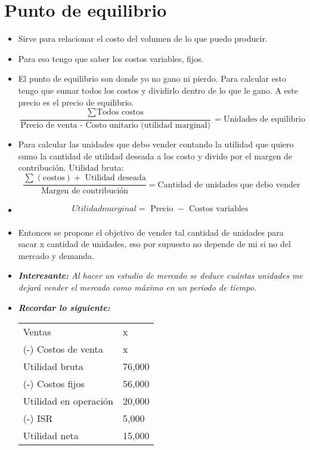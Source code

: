 \section{Punto de equilibrio}
\begin{itemize}
    \item Sirve para relacionar el costo del volumen de lo que puedo producir.
    \item Para eso tengo que saber los costos variables, fijos.
    \item El punto de equilibrio son donde yo no gano ni pierdo. Para calcular esto tengo que sumar todos los costos y dividirlo dentro de lo que le gano. A este precio es el precio de equilibrio.
        \[
          \frac{\sum_{}^{}\text{Todos costos}}{\text{Precio de venta - Costo unitario (utilidad marginal)}} = \text{Unidades de equilibrio }
        \]
        
    \item Para calcular las unidades que debo vender contando la utilidad que quiero sumo la cantidad de utilidad deseada a los costo y divido por el margen de contribución. Utilidad bruta: 
        \[
        \frac{\sum_{}^{}(\text{costos}) + \text{ Utilidad deseada} }{\text{Margen de contribución}} = \text{Cantidad de unidades que debo vender}
        \]
    
    \item 
        \begin{align*}
            Utilidad marginal = \text{  Precio  } - \text{  Costos variables  } \\ 
        \end{align*}
    \item Entonces se propone el objetivo de vender tal cantidad de unidades para sacar x cantidad de unidades, eso por supuesto no depende de mi si no del mercado y demanda.
    \item \emph{\textbf{Interesante:} Al hacer un estudio de mercado se deduce cuántas unidades me dejará vender el mercado como máximo en un periodo de tiempo.}
    \item \emph{\textbf{Recordar lo siguiente: }}
        \begin{center}
           \begin{tabular}{ | p{5cm} | p{5cm} | }
               \hline
                    Ventas & x    \\
                    (-) Costos de venta & x \\ 
               \hline
                    Utilidad bruta & 76,000 \\ 
                    (-) Costos fijos & 56,000 \\ 
                \hline
                    Utilidad en operación & 20,000 \\ 
                    (-) ISR & 5,000 \\ 
                    Utilidad neta & 15,000 \\ 
                \hline
           \end{tabular}
        \end{center}
    

\end{itemize}
